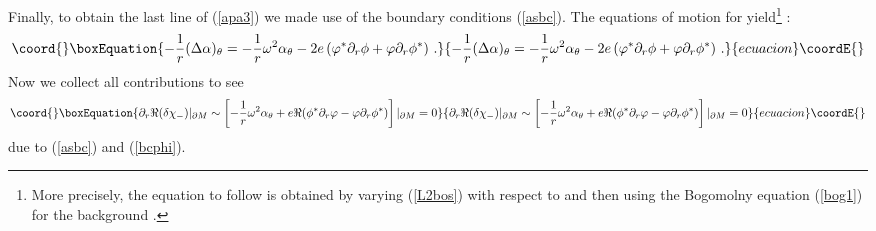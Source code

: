 \documentclass[a4paper,12pt]{article}
\begin{document}
Finally, to obtain the last line of (\ref{apa3}) we made use of
the boundary conditions (\ref{asbc}). The equations of motion for
\myHighlight{$\alpha_\theta$}\coordHE{} yield\footnote{More precisely, the equation to
follow is obtained by varying (\ref{L2bos}) with respect to
\myHighlight{$\alpha_\theta$}\coordHE{} and then using the Bogomolny equation (\ref{bog1})
for the background \myHighlight{$\phi$}\coordHE{}.} :
\begin{equation}\coord{}\boxEquation{
-\frac 1r (\Delta \alpha)_\theta = -\frac 1r \omega^2
\alpha_\theta - 2e \left( \varphi^* \partial_r \phi +
\varphi\partial_r \phi^* \right) \,. \label{apa5}
}{
-\frac 1r (\Delta \alpha)_\theta = -\frac 1r \omega^2
\alpha_\theta - 2e \left( \varphi^* \partial_r \phi +
\varphi\partial_r \phi^* \right) \,. }{ecuacion}\coordE{}\end{equation}
Now we collect all contributions to see
\begin{equation}\coord{}\boxEquation{
\partial_r \Re (\delta \chi_-) |_{\partial M}\sim
\left[ -\frac 1r \omega^2 \alpha_\theta + e\Re (\phi^*
\partial_r \varphi -\varphi \partial_r \phi^*) \right]|_{\partial M}=0
\label{apa6}
}{
\partial_r \Re (\delta \chi_-) |_{\partial M}\sim
\left[ -\frac 1r \omega^2 \alpha_\theta + e\Re (\phi^*
\partial_r \varphi -\varphi \partial_r \phi^*) \right]|_{\partial M}=0
}{ecuacion}\coordE{}\end{equation}
due to (\ref{asbc}) and (\ref{bcphi}).
\end{document}

